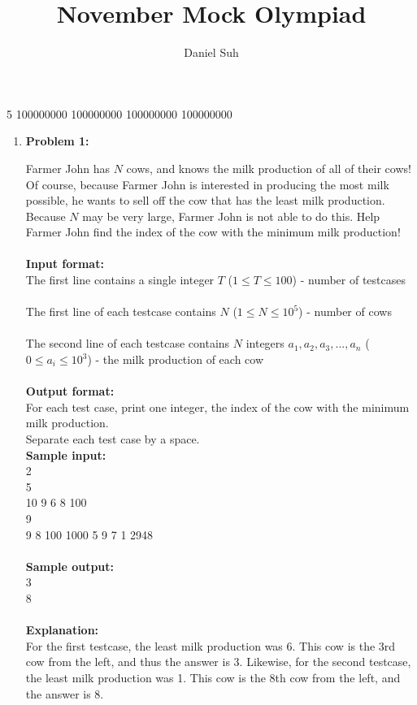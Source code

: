 \documentclass[11pt]{article}
\begin{document}
\author{Daniel Suh}
\title{November Mock Olympiad}
\maketitle

 5 100000000 100000000 100000000 100000000 
\begin{enumerate}

\item
\textbf{Problem 1:}

Farmer John has $N$ cows, and knows the milk production of all of their cows! Of course, because Farmer John is interested in producing the most milk possible, he wants to sell off the cow that has the least milk production. Because $N$ may be very large, Farmer John is not able to do this. Help Farmer John find the index of the cow with the minimum milk production!
\\
\\
\textbf{Input format:}\\
The first line contains a single integer $T$ ($1 \leq T \leq 100$) - number of testcases\\\\
The first line of each testcase contains $N$ ($1 \leq N \leq 10^5$) - number of cows\\\\
The second line of each testcase contains $N$ integers $a_1, a_2, a_3, ..., a_n$ ($0 \leq a_i \leq 10^3$) - the milk production of each cow
\\\\
\textbf{Output format:}\\
For each test case, print one integer, the index of the cow with the minimum milk production. \\Separate each test case by a space.\\

\textbf{Sample input:}
\\
2\\
5\\
10 9 6 8 100\\
9\\
9 8 100 1000 5 9 7 1 2948
\\
\\
\textbf{Sample output:}
\\
3\\
8\\
\\
\textbf{Explanation:}
\\
For the first testcase, the least milk production was 6. This cow is the 3rd cow from the left, and thus the answer is 3. Likewise, for the second testcase, the least milk production was 1. This cow is the 8th cow from the left, and the answer is 8.
\\
\pagebreak



\end{enumerate}
\end{document}
